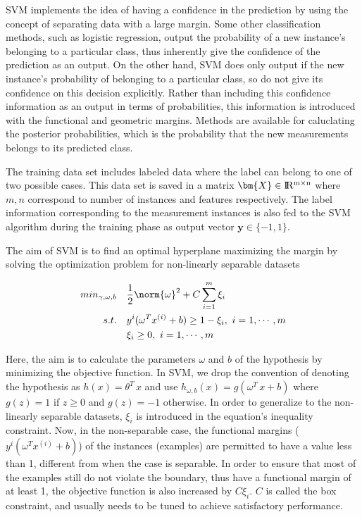 SVM implements the idea of having a confidence in the prediction by using the concept of separating data with a large margin. 
Some other classification methods, such as logistic regression, output the probability of a new instance's belonging to a particular class, thus inherently give the confidence of the prediction as an output. 
On the other hand, SVM does only output if the new instance's probability of belonging to a particular class, so do not give its confidence on this decision explicitly. %
Rather than including this confidence information as an output in terms of probabilities, this information is introduced with the functional and geometric margins. 
Methods are available for caluclating the posterior probabilities, which is the probability that the new measurements belongs to its predicted class\cite{platt1999probabilistic}. 

The training data set includes labeled data where the label can belong to one of two possible cases. This data set is saved in a matrix $\bm{X} \in {\rm I\!R^{m \times n}}  $ where $m,n$ correspond to number of instances and features respectively. The label information corresponding to the measurement instances is also fed to the SVM algorithm during the training phase as output vector $\bm{y} \in \{-1,1\}$. 

The aim of SVM is to find an optimal hyperplane maximizing the margin by solving the optimization problem for non-linearly separable datasets

\begin{align}
min_{\gamma,\omega,b} \quad & \frac{1}{2} \norm{\omega}^2 + C \sum\limits_{i = 1}^m \xi_i \\
s.t. \quad & y^{i}(\omega^T x^{(i)} + b) \geq 1 - \xi_i, \ i = 1, \cdots, m\\
 & \xi_i \geq 0, \ i = 1, \cdots, m
\end{align}

Here, the aim is to calculate the parameters $\omega$ and $b$ of the hypothesis by minimizing the objective function. In SVM, we drop the convention of denoting the hypothesis as $h(x)= \theta^T \, x$ and use $h_{\omega,b}(x)=g(\omega^T \, x + b)$ where $g(z) = 1$ if $z\geq0$ and $g(z)=-1$ otherwise. In order to generalize to the non-linearly separable datasets, $\xi_i$ is introduced in the equation's inequality constraint. Now, in the non-separable case, the functional margins ($y^{i}(\omega^T x^{(i)} + b)$) of the instances (examples) are permitted to have a value less than 1, different from when the case is separable. In order to ensure that most of the examples still do not violate the boundary, thus have a functional margin of at least 1, the objective function is also increased by $C \xi_i$. $C$ is called the box constraint, and usually needs to be tuned to achieve satisfactory performance.

